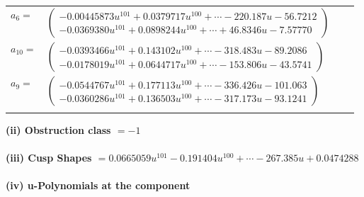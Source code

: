 \documentclass[1p]{elsarticle_modified}
\theoremstyle{definition}
\begin{document}
\begin{tabular}{m{7pt} m{180pt} m{7pt} m{180pt} }
\flushright $a_{6}=$&$\begin{pmatrix}-0.00445873 u^{101}+0.0379717 u^{100}+\cdots-220.187 u-56.7212\\-0.0369380 u^{101}+0.0898244 u^{100}+\cdots+46.8346 u-7.57770\end{pmatrix}$ \\
\flushright $a_{10}=$&$\begin{pmatrix}-0.0393466 u^{101}+0.143102 u^{100}+\cdots-318.483 u-89.2086\\-0.0178019 u^{101}+0.0644717 u^{100}+\cdots-153.806 u-43.5741\end{pmatrix}$ \\
\flushright $a_{9}=$&$\begin{pmatrix}-0.0544767 u^{101}+0.177113 u^{100}+\cdots-336.426 u-101.063\\-0.0360286 u^{101}+0.136503 u^{100}+\cdots-317.173 u-93.1241\end{pmatrix}$\\&\end{tabular}
\flushleft \textbf{(ii) Obstruction class $= -1$}\\~\\
\flushleft \textbf{(iii) Cusp Shapes $= 0.0665059 u^{101}-0.191404 u^{100}+\cdots-267.385 u+0.0474288$}\\~\\
\newpage\renewcommand{\arraystretch}{1}
\flushleft \textbf{(iv) u-Polynomials at the component}\newline \\
\end{document}
